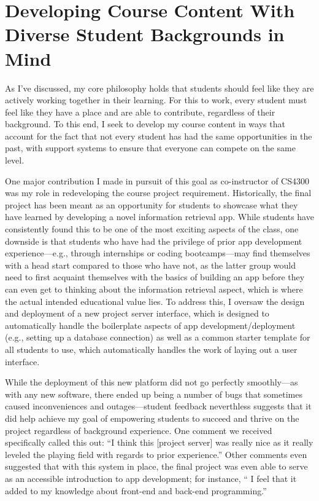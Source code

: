 \documentclass[12pt,letterpaper]{article}
\begin{document}
\section{Developing Course Content With Diverse Student Backgrounds in Mind}
As I've discussed, my core philosophy holds that students should feel like they are actively working together in their learning.
For this to work, every student must feel like they have a place and are able to contribute, regardless of their background.
To this end, I seek to develop my course content in ways that account for the fact that not every student has had the same opportunities in the past, with support systems to ensure that everyone can compete on the same level.

One major contribution I made in pursuit of this goal as co-instructor of CS4300 was my role in redeveloping the course project requirement.
Historically, the final project has been meant as an opportunity for students to showcase what they have learned by developing a novel information retrieval app.
While students have consistently found this to be one of the most exciting aspects of the class, one downside is that students who have had the privilege of prior app development experience---e.g., through internships or coding bootcamps---may find themselves with a head start compared to those who have not, as the latter group would need to first acquaint themselves with the basics of building an app before they can even get to thinking about the information retrieval aspect, which is where the actual intended educational value lies.
To address this, I oversaw the design and deployment of a new project server interface, which is designed to automatically handle the boilerplate aspects of app development/deployment (e.g., setting up a database connection) as well as a common starter template for all students to use, which automatically handles the work of laying out a user interface.

While the deployment of this new platform did not go perfectly smoothly---as with any new software, there ended up being a number of bugs that sometimes caused inconveniences and outages---student feedback neverthless suggests that it did help achieve my goal of empowering students to succeed and thrive on the project regardless of background experience.
One comment we received specifically called this out: ``I think this [project server] was really nice as it really leveled the playing field with regards to prior experience.''
Other comments even suggested that with this system in place, the final project was even able to serve as an accessible introduction to app development; for instance, `` I feel that it added to my knowledge about front-end and back-end programming.''
\end{document}
